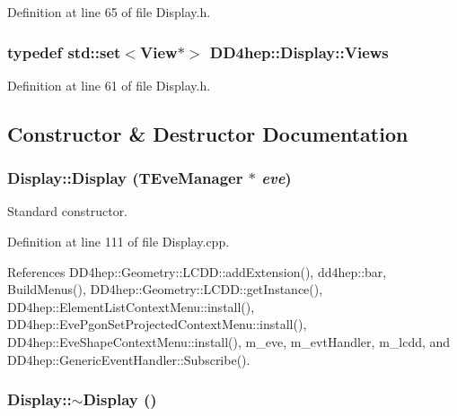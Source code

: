 Definition at line 65 of file Display.h.\hypertarget{class_d_d4hep_1_1_display_a93fcdf6ec0390291e26d59d0d78cd6e8}{
\subsubsection[{Views}]{\setlength{\rightskip}{0pt plus 5cm}typedef std::set$<${\bf View}$\ast$$>$ {\bf DD4hep::Display::Views}}}
\label{class_d_d4hep_1_1_display_a93fcdf6ec0390291e26d59d0d78cd6e8}


Definition at line 61 of file Display.h.

\subsection{Constructor \& Destructor Documentation}
\hypertarget{class_d_d4hep_1_1_display_a9038e67619d22b62a928fa32d912ea10}{
\subsubsection[{Display}]{\setlength{\rightskip}{0pt plus 5cm}Display::Display (TEveManager $\ast$ {\em eve})}}
\label{class_d_d4hep_1_1_display_a9038e67619d22b62a928fa32d912ea10}


Standard constructor. 

Definition at line 111 of file Display.cpp.

References DD4hep::Geometry::LCDD::addExtension(), dd4hep::bar, BuildMenus(), DD4hep::Geometry::LCDD::getInstance(), DD4hep::ElementListContextMenu::install(), DD4hep::EvePgonSetProjectedContextMenu::install(), DD4hep::EveShapeContextMenu::install(), m\_\-eve, m\_\-evtHandler, m\_\-lcdd, and DD4hep::GenericEventHandler::Subscribe().\hypertarget{class_d_d4hep_1_1_display_ac2607a6bb236c55547a4223d40d85d1f}{
\subsubsection[{$\sim$Display}]{\setlength{\rightskip}{0pt plus 5cm}Display::$\sim$Display ()}}
\label{class_d_d4hep_1_1_display_ac2607a6bb236c55547a4223d40d85d1f}


